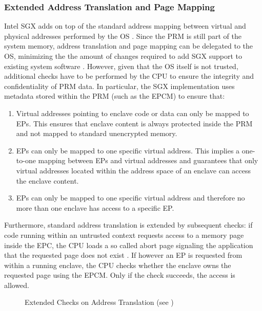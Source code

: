 \subsubsection{Extended Address Translation and Page Mapping}
\label{sec:AddressTranslation}
Intel SGX adds  on top of the standard address mapping between virtual and physical addresses performed by the OS \cite{Costan2016IntelSE}. Since the PRM is still part of the 
system memory, address translation and page mapping can be delegated to the OS, minimizing the the amount of changes required to add SGX support to existing system software 
\cite{IntelSGXSSLab}. However, given that the OS itself is not trusted, additional checks have to be performed by the CPU to ensure the integrity and confidentiality of PRM 
data. In particular, the SGX implementation uses metadata stored within the PRM (such as the EPCM) to ensure that:
\begin{enumerate}
    \item Virtual addresses pointing to enclave code or data can only be mapped to EPs. This ensures that enclave content is always protected inside the PRM and not mapped to
          standard unencrypted memory.
    \item EPs can only be mapped to one specific virtual address. This implies a one-to-one mapping between EPs and virtual addresses and guarantees that only virtual addresses
          located within the address space of an enclave can access the enclave content.
    \item EPs can only be mapped to one specific virtual address and therefore no more than one enclave has access to a specific EP.
\end{enumerate}
Furthermore, standard address translation is extended by subsequent checks: if code running within an untrusted context requests access to a memory page inside the EPC,
the CPU loads a so called abort page signaling the application that the requested page does not exist \cite{Costan2016IntelSE}. If however an EP is requested from within a
running enclave, the CPU checks whether the enclave owns the requested page using the EPCM. Only if the check succeeds, the access is allowed.

\begin{figure}[h!]
    \centering
    \caption{Extended Checks on Address Translation (see \cite{IntelSGXExplanation})}
    \label{fig:pageCheck}
\end{figure}